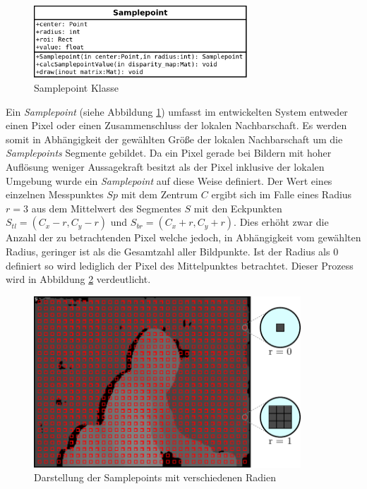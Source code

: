 \begin{figure}[h]
	\centering
	\includegraphics[width=8cm]{img/samplepoint_class}
	\caption{Samplepoint Klasse}
	\label{fig:samplepoint_class}
\end{figure}

\noindent
Ein \emph{Samplepoint} (siehe Abbildung \ref{fig:samplepoint_class}) umfasst im entwickelten System entweder einen Pixel oder einen Zusammenschluss der lokalen Nachbarschaft. Es werden somit in Abhängigkeit der gewählten Größe der lokalen Nachbarschaft um die \emph{Samplepoints} Segmente gebildet. Da ein Pixel gerade bei Bildern mit hoher Auflösung weniger Aussagekraft besitzt als der Pixel inklusive der lokalen Umgebung wurde ein \emph{Samplepoint} auf diese Weise definiert. Der Wert eines einzelnen Messpunktes $Sp$ mit dem Zentrum $C$ ergibt sich im Falle eines Radius $r=3$ aus dem Mittelwert des Segmentes $S$ mit den Eckpunkten $S_{tl} = (C_x - r, C_y -r)$ und $S_{br} = (C_x + r, C_y +r)$. Dies erhöht zwar die Anzahl der zu betrachtenden Pixel welche jedoch, in Abhängigkeit vom gewählten Radius, geringer ist als die Gesamtzahl aller Bildpunkte. Ist der Radius als $0$ definiert so wird lediglich der Pixel des Mittelpunktes betrachtet. Dieser Prozess wird in Abbildung \ref{fig:samplepoints_initmodes} verdeutlicht.\\

\begin{figure}[h]
	\begin{center}
		\includegraphics[width=10cm]{img/samplepoints_initmodes.pdf}
	\end{center}
	\caption{Darstellung der Samplepoints mit verschiedenen Radien}
	\label{fig:samplepoints_initmodes}
\end{figure}

